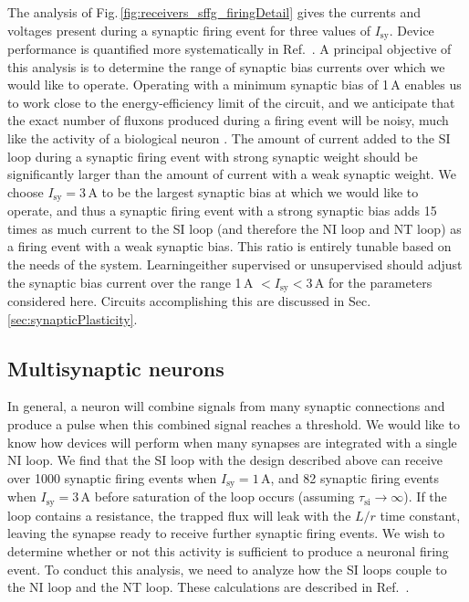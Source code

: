 \documentclass[twocolumn]{article}
\newcommand{\onlinecite}[1]{\hspace{-1 ex} \nocite{#1}\citenum{#1}}
\begin{document}
The analysis of Fig.\,\ref{fig:receivers_sffg_firingDetail} gives the currents and voltages present during a synaptic firing event for three values of $I_{\mathrm{sy}}$. Device performance is quantified more systematically in Ref.\,\onlinecite{sh2018b}. A principal objective of this analysis is to determine the range of synaptic bias currents over which we would like to operate. Operating with a minimum synaptic bias of 1\,\textmu A enables us to work close to the energy-efficiency limit of the circuit, and we anticipate that the exact number of fluxons produced during a firing event will be noisy, much like the activity of a biological neuron \cite{stgo2005}. The amount of current added to the SI loop during a synaptic firing event with strong synaptic weight should be significantly larger than the amount of current with a weak synaptic weight. We choose $I_{\mathrm{sy}} = 3$\,\textmu A to be the largest synaptic bias at which we would like to operate, and thus a synaptic firing event with a strong synaptic bias adds 15 times as much current to the SI loop (and therefore the NI loop and NT loop) as a firing event with a weak synaptic bias. This ratio is entirely tunable based on the needs of the system. Learning\textemdash either supervised or unsupervised \textemdash should adjust the synaptic bias current over the range 1\,\textmu A $< I_{\mathrm{sy}} < 3$\,\textmu A for the parameters considered here. Circuits accomplishing this are discussed in Sec.\,\ref{sec:synapticPlasticity}.

\subsection{\label{sec:scaling}Multisynaptic neurons}
In general, a neuron will combine signals from many synaptic connections and produce a pulse when this combined signal reaches a threshold. We would like to know how devices will perform when many synapses are integrated with a single NI loop. We find that the SI loop with the design described above can receive over 1000 synaptic firing events when $I_{\mathrm{sy}} = 1$\,\textmu A, and 82 synaptic firing events when $I_{\mathrm{sy}} = 3$\,\textmu A before saturation of the loop occurs (assuming $\tau_{\mathrm{si}}\rightarrow \infty$). If the loop contains a resistance, the trapped flux will leak with the $L/r$ time constant, leaving the synapse ready to receive further synaptic firing events. We wish to determine whether or not this activity is sufficient to produce a neuronal firing event. To conduct this analysis, we need to analyze how the SI loops couple to the NI loop and the NT loop. These calculations are described in Ref.\,\onlinecite{sh2018b}.  
\end{document}
